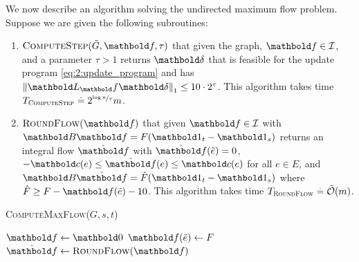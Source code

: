 \documentclass{tufte-handout}
\newcommand{\etil}{\Tilde{e}}
\newcommand{\barrierflowset}{\mathcal{I}}
\begin{document}
We now describe an algorithm solving the undirected maximum flow problem. Suppose we are given the following subroutines: \begin{enumerate}
    \item $\textsc{ComputeStep}(\Tilde{G}, \vf, \tau)$ that given the graph, $\vf \in \barrierflowset$, and a parameter $\tau > 1$ returns $\vdelta$ that is feasible for the update program \eqref{eq:2:update_program} and has $\norm{\mL_\vf\vdelta}_1 \leq 10 \cdot 2^\tau$. This algorithm takes time $T_{\textsc{ComputeStep}} \overset{.}{=} 2^{\nicefrac{\log n}{\tau}} m$.
    
    \item $\textsc{RoundFlow}(\vf)$ that given $\vf \in \barrierflowset$ with $\mB\vf = F(\vOne_t - \vOne_s)$ returns an integral flow $\hat{\vf}$ with $\hat{\vf}(\etil) = 0$, $-\vc(e) \leq \hat{\vf}(e) \leq \vc(e)$ for all $e \in E$, and $\mB\hat{\vf} = \hat{F}(\vOne_t - \vOne_s)$ where $\hat{F} \geq F - \vf(\etil) - 10$. This algorithm takes time $T_{\textsc{RoundFlow}} \defeq \TildeLandauO{m}$.
\end{enumerate}

\begin{algorithm}
    \caption{\textsc{ComputeMaxFlow($G, s, t$)}}\label{alg:2}
    $\vf \gets \vZero$\;
    $\vf(\etil) \gets F$\;
    $\hat{\vf} \gets \textsc{RoundFlow}(\vf)$\;
    \Return{$\hat{\vf}$}
\end{algorithm}
\end{document}
